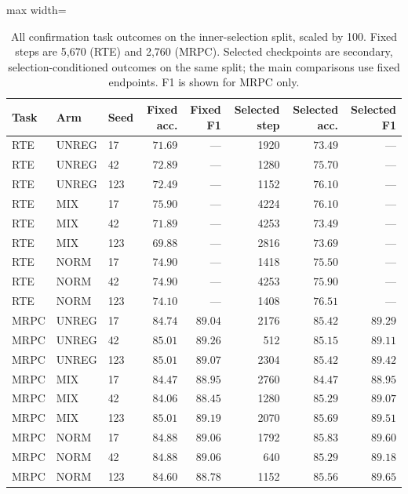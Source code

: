 \documentclass{article}
\begin{document}
\begin{table}[t]
\centering
\caption{All confirmation task outcomes on the inner-selection split, scaled by 100. Fixed steps are 5{,}670 (RTE) and 2{,}760 (MRPC). Selected checkpoints are secondary, selection-conditioned outcomes on the same split; the main comparisons use fixed endpoints. F1 is shown for MRPC only.}
\label{tab:focusedtasks}
\begin{adjustbox}{max width=\linewidth}
\begin{tabular}{lllrrrrr}
\toprule
Task & Arm & Seed & Fixed acc. & Fixed F1 & Selected step & Selected acc. & Selected F1\\
\midrule
RTE & UNREG & 17 & $71.69$ & --- & 1920 & $73.49$ & --- \\
RTE & UNREG & 42 & $72.89$ & --- & 1280 & $75.70$ & --- \\
RTE & UNREG & 123 & $72.49$ & --- & 1152 & $76.10$ & --- \\
RTE & MIX & 17 & $75.90$ & --- & 4224 & $76.10$ & --- \\
RTE & MIX & 42 & $71.89$ & --- & 4253 & $73.49$ & --- \\
RTE & MIX & 123 & $69.88$ & --- & 2816 & $73.69$ & --- \\
RTE & NORM & 17 & $74.90$ & --- & 1418 & $75.50$ & --- \\
RTE & NORM & 42 & $74.90$ & --- & 4253 & $75.90$ & --- \\
RTE & NORM & 123 & $74.10$ & --- & 1408 & $76.51$ & --- \\
\midrule
MRPC & UNREG & 17 & $84.74$ & $89.04$ & 2176 & $85.42$ & $89.29$ \\
MRPC & UNREG & 42 & $85.01$ & $89.26$ & 512 & $85.15$ & $89.11$ \\
MRPC & UNREG & 123 & $85.01$ & $89.07$ & 2304 & $85.42$ & $89.42$ \\
MRPC & MIX & 17 & $84.47$ & $88.95$ & 2760 & $84.47$ & $88.95$ \\
MRPC & MIX & 42 & $84.06$ & $88.45$ & 1280 & $85.29$ & $89.07$ \\
MRPC & MIX & 123 & $85.01$ & $89.19$ & 2070 & $85.69$ & $89.51$ \\
MRPC & NORM & 17 & $84.88$ & $89.06$ & 1792 & $85.83$ & $89.60$ \\
MRPC & NORM & 42 & $84.88$ & $89.06$ & 640 & $85.29$ & $89.18$ \\
MRPC & NORM & 123 & $84.60$ & $88.78$ & 1152 & $85.56$ & $89.65$ \\
\bottomrule
\end{tabular}
\end{adjustbox}
\end{table}
\end{document}
